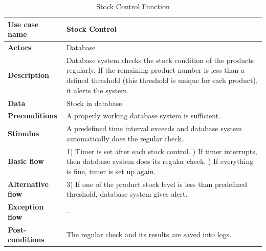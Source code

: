  \begin{table}[H]
     \centering
     \begin{tabular}{ | l | p{10cm} |}
     \hline
     \textbf{Use case name}    & Stock Control \\
     \hline
     \textbf{Actors}           & Database \\
     \hline
     \textbf{Description}      & Database system checks the stock condition of the products regularly. If the remaining product number is less than a defined threshold (this threshold is unique for each product), it alerts the system.\\
     \hline
     \textbf{Data}             & Stock in database  \\
     \hline
     \textbf{Preconditions}    & A properly working database system is sufficient. \\
     \hline
     \textbf{Stimulus}         & A predefined time interval exceeds and database system automatically does the regular check. \\
     \hline
     \textbf{Basic flow}       & 1) Timer is set after each stock control. \newline 2) If timer interrupts, then database system does its regular check. \newline 3) If everything is fine, timer is set up again.\\
     \hline
     \textbf{Alternative flow} & 3) If one of the product stock level is less than predefined threshold, database system gives alert. \\
     \hline
     \textbf{Exception flow}   & -\\
     \hline
     \textbf{Post-conditions}  & The regular check and its results are saved into logs. \\
     \hline
     \end{tabular} \caption{Stock Control Function}
     \label{tab:11stock_controlt}
 \end{table}

